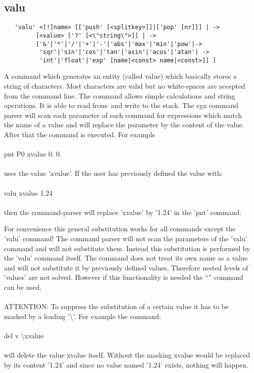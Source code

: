 \documentclass{article}
\begin{document}
\subsection{\label{valu}valu}
\begin{verbatim}
   'valu' <[!]name> [['push' [<splitkey>]]|['pop' [nr]]] | ->
         [<value> ['?' [<\"string\">]] | ->
         ['&'|'*'|'/'|'+'|'-'|'abs'|'max'|'min'|'pow'|->
          'sqr'|'sin'|'cos'|'tan'|'asin'|'acos'|'atan'| ->
          'int'|'float'|'exp' [name|<const> name|<const>]] ]
\end{verbatim}
A command which generates an entity (called value) which basically stores a string of characters. Most characters are valid but no white-spaces are accepted from the command line. The command allows simple calculations and string operations. It is able to read from- and write to the stack.
The cgx command parser will scan each parameter of each command for expressions which match the name of a value and will replace the parameter by the content of the value. After that the command is executed. For example\\\\pnt P0 xvalue 0. 0.\\\\uses the value 'xvalue'. If the user has previously defined the value with:\\\\valu xvalue 1.24\\\\then the command-parser will replace 'xvalue' by '1.24' in the 'pnt' command.

For convenience this general substitution works for all commands except the 'valu' command! The command parser will not scan the parameters of the 'valu' command and will not substitute them. Instead this substitution is performed by the 'valu' command itself. The command does not treat its own name as a value and will not substitute it by previously defined values. Therefore nested levels of 'values' are not solved. However if this functionality is needed the ``'' command can be used.\\\\

ATTENTION: To suppress the substitution of a certain value it has to be masked by a leading '\textbackslash{}'. For example the command:\\\\del v \textbackslash{}xvalue\\\\will delete the value xvalue itself. Without the masking xvalue would be replaced by its content '1.24' and since no value named '1.24' exists, nothing will happen.
\end{document}
